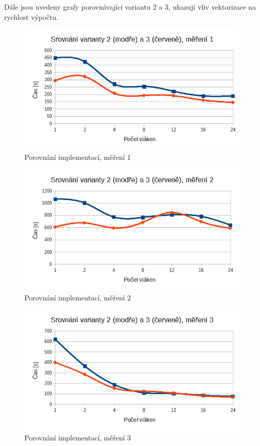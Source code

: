 \documentclass[12pt]{article}
\begin{document}
Dále jsou uvedeny grafy porovnávající variantu 2 a 3, ukazují vliv vektorizace na rychlost výpočtu.

\begin{figure}[H]
  \begin{center}
      \includegraphics[width=12cm]{images/vs1.png}	
    \caption{Porovnání implementací, měření 1} 
  \end{center}
\end{figure}

\begin{figure}
  \begin{center}
      \includegraphics[width=12cm]{images/vs2.png}	
    \caption{Porovnání implementací, měření 2}
  \end{center}
\end{figure}

\begin{figure}
  \begin{center}
      \includegraphics[width=12cm]{images/vs3.png}	
    \caption{Porovnání implementací, měření 3}
  \end{center}
\end{figure}
\end{document}
